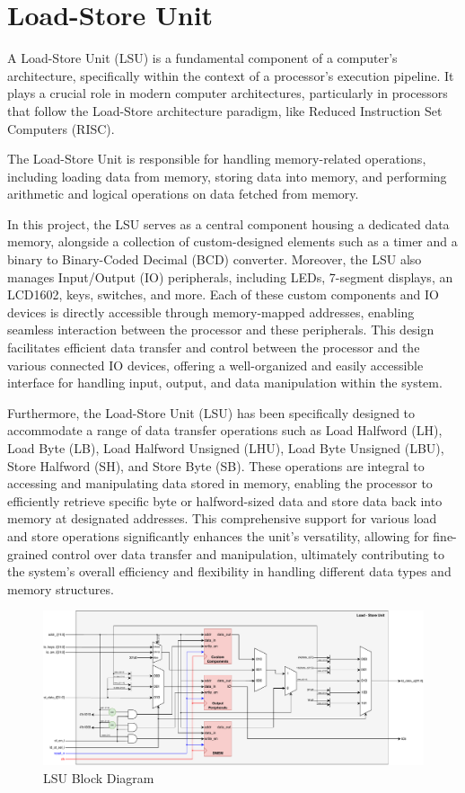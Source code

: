 \documentclass[12pt,a4paper,oneside]{book} %
\begin{document}
\section{Load-Store Unit}
A Load-Store Unit (LSU) is a fundamental component of a computer's architecture, specifically within the context of a processor's execution pipeline. It plays a crucial role in modern computer architectures, particularly in processors that follow the Load-Store architecture paradigm, like Reduced Instruction Set Computers (RISC).

The Load-Store Unit is responsible for handling memory-related operations, including loading data from memory, storing data into memory, and performing arithmetic and logical operations on data fetched from memory. 

In this project, the LSU serves as a central component housing a dedicated data memory, alongside a collection of custom-designed elements such as a timer and a binary to Binary-Coded Decimal (BCD) converter. Moreover, the LSU also manages Input/Output (IO) peripherals, including LEDs, 7-segment displays, an LCD1602, keys, switches, and more. Each of these custom components and IO devices is directly accessible through memory-mapped addresses, enabling seamless interaction between the processor and these peripherals. This design facilitates efficient data transfer and control between the processor and the various connected IO devices, offering a well-organized and easily accessible interface for handling input, output, and data manipulation within the system.

Furthermore, the Load-Store Unit (LSU) has been specifically designed to accommodate a range of data transfer operations such as Load Halfword (LH), Load Byte (LB), Load Halfword Unsigned (LHU), Load Byte Unsigned (LBU), Store Halfword (SH), and Store Byte (SB). These operations are integral to accessing and manipulating data stored in memory, enabling the processor to efficiently retrieve specific byte or halfword-sized data and store data back into memory at designated addresses. This comprehensive support for various load and store operations significantly enhances the unit's versatility, allowing for fine-grained control over data transfer and manipulation, ultimately contributing to the system's overall efficiency and flexibility in handling different data types and memory structures.

\begin{figure}[H]
    \centering
    \includegraphics[width=.9\textwidth]{images/lsu.pdf}
    \caption{LSU Block Diagram}
\end{figure}
\end{document}
